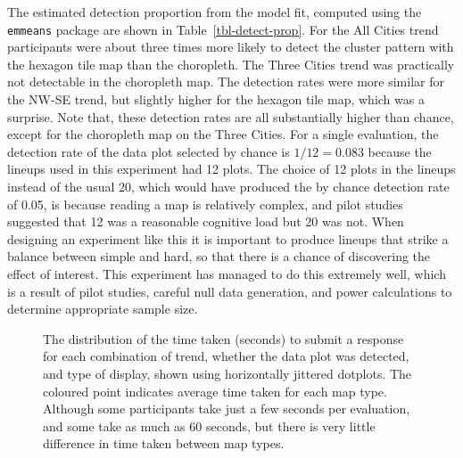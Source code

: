 \documentclass[
doublespace,
  times]{anzsauth}
\begin{document}
The estimated detection proportion from the model fit, computed using
the \texttt{emmeans} package \citep{Lenth2025} are shown in
Table~\ref{tbl-detect-prop}. For the All Cities trend participants were
about three times more likely to detect the cluster pattern with the
hexagon tile map than the choropleth. The Three Cities trend was
practically not detectable in the choropleth map. The detection rates
were more similar for the NW-SE trend, but slightly higher for the
hexagon tile map, which was a surprise. Note that, these detection rates
are all substantially higher than chance, except for the choropleth map
on the Three Cities. For a single evaluation, the detection rate of the
data plot selected by chance is \(1/12=0.083\) because the lineups used
in this experiment had 12 plots. The choice of 12 plots in the lineups
instead of the usual 20, which would have produced the by chance
detection rate of 0.05, is because reading a map is relatively complex,
and pilot studies suggested that 12 was a reasonable cognitive load but
20 was not. When designing an experiment like this it is important to
produce lineups that strike a balance between simple and hard, so that
there is a chance of discovering the effect of interest. This experiment
has managed to do this extremely well, which is a result of pilot
studies, careful null data generation, and power calculations to
determine appropriate sample size.

\begin{figure}


\caption{\label{fig-beeswarm}The distribution of the time taken
(seconds) to submit a response for each combination of trend, whether
the data plot was detected, and type of display, shown using
horizontally jittered dotplots. The coloured point indicates average
time taken for each map type. Although some participants take just a few
seconds per evaluation, and some take as much as 60 seconds, but there
is very little difference in time taken between map types.}

\end{figure}%
\end{document}

